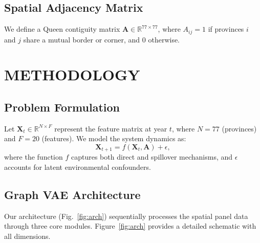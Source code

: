 \documentclass[conference]{IEEEtran}
\begin{document}
\subsection{Spatial Adjacency Matrix}
We define a Queen contiguity matrix $\mathbf{A} \in \mathbb{R}^{77\times 77}$, where $A_{ij}=1$ if provinces $i$ and $j$ share a mutual border or corner, and $0$ otherwise.

\section{METHODOLOGY}

\subsection{Problem Formulation}
Let $\mathbf{X}_t \in \mathbb{R}^{N \times F}$ represent the feature matrix at year $t$, where $N=77$ (provinces) and $F=20$ (features). We model the system dynamics as:
\[
\mathbf{X}_{t+1} = f(\mathbf{X}_t, \mathbf{A}) + \epsilon,
\]
where the function $f$ captures both direct and spillover mechanisms, and $\epsilon$ accounts for latent environmental confounders.

\subsection{Graph VAE Architecture}
Our architecture (Fig.~\ref{fig:arch}) sequentially processes the spatial panel data through three core modules. Figure~\ref{fig:arch} provides a detailed schematic with all dimensions.
\end{document}
